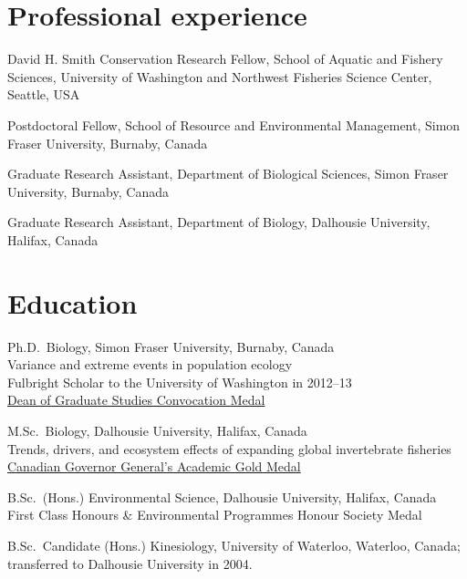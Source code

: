 \section{Professional experience}\label{professional-experience}

\begin{description}
\tightlist
\item[2015--17]
David H. Smith Conservation Research Fellow, School of Aquatic and
Fishery Sciences, University of Washington and Northwest Fisheries
Science Center, Seattle, USA
\item[2015]
Postdoctoral Fellow, School of Resource and Environmental Management,
Simon Fraser University, Burnaby, Canada
\item[2011--15]
Graduate Research Assistant, Department of Biological Sciences, Simon
Fraser University, Burnaby, Canada
\item[2008--11]
Graduate Research Assistant, Department of Biology, Dalhousie
University, Halifax, Canada
\end{description}

\section{Education}\label{education}

\begin{description}
\tightlist
\item[2011--15]
Ph.D.\ Biology, Simon Fraser University, Burnaby, Canada\\
Variance and extreme events in population ecology\\
Fulbright Scholar to the University of Washington in 2012--13\\
\href{https://www.sfu.ca/dean-gradstudies/blog/year/2015/06/SeanAnderson.html}{Dean
of Graduate Studies Convocation Medal}
\item[2008--10]
M.Sc.\ Biology, Dalhousie University, Halifax, Canada\\
Trends, drivers, and ecosystem effects of expanding global invertebrate
fisheries\\
\href{http://goo.gl/nA1zE}{Canadian Governor General's Academic Gold
Medal}
\item[2004--07]
B.Sc.\ (Hons.) Environmental Science, Dalhousie University, Halifax,
Canada\\
First Class Honours \& Environmental Programmes Honour Society Medal
\item[2001--03]
B.Sc.\ Candidate (Hons.) Kinesiology, University of Waterloo, Waterloo,
Canada; transferred to Dalhousie University in 2004.
\end{description}


